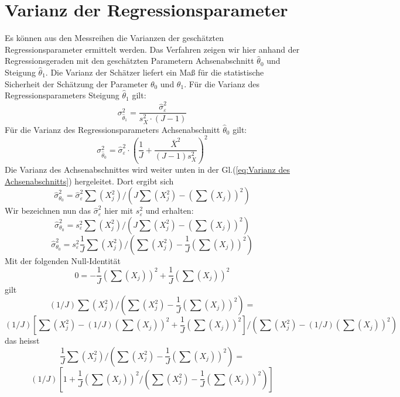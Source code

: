 \section{Varianz der Regressionsparameter}
\label{subsec:vertrauensbereiche}
Es können aus den Messreihen die Varianzen der
geschätzten Regressionsparameter ermittelt werden. Das Verfahren zeigen wir
hier anhand der Regressionsgeraden mit den geschätzten Parametern
Achsenabschnitt $\hat{\theta}_0 $ und Steigung $\hat\theta_1 $.
Die Varianz der Schätzer liefert ein Ma{\ss} f\"{u}r die statistische
Sicherheit der Sch\"{a}tzung der Parameter $\theta _0 $ und
$\theta _1 $.
Für die Varianz des Regressionsparameters Steigung $\hat{\theta}_1 $
gilt:
\begin{equation}
\sigma^2_{\hat{\theta}_1} = \frac{ \hat \sigma^2_{\varepsilon}}{s^2_X \cdot (J- 1) }
\end{equation}
Für die Varianz des Regressionsparameters Achsenabschnitt $\hat{\theta}_0 $
gilt:
\begin{equation}
\sigma^2_{\hat{\theta}_0} = \hat \sigma^2_{\varepsilon} \cdot \left(\frac{1}{J}
	+ \frac{\bar {X}^2}{(J - 1) s_X^2 }\right)^2
\end{equation}
Die Varianz des Achsenabschnittes wird weiter unten in der Gl.(\ref{eq:Varianz des Achsenabschnitts}) hergeleitet. Dort ergibt sich \begin{equation}
\hat \sigma^2_{\theta_0}  = \hat \sigma^2_{\varepsilon}  \sum(X_j^2)  / (J \sum(X_j^2) - (\sum(X_j))^2)
\end{equation}
Wir bezeichnen nun das $\hat \sigma^2_{\varepsilon}$ hier mit $s^2_{\varepsilon}$ und erhalten:
\begin{equation}
\hat \sigma^2_{\theta_0}  = s^2_{\varepsilon} \sum(X_j^2)  / (J \sum(X_j^2) - (\sum(X_j))^2)
\end{equation}
\begin{equation}
\hat \sigma^2_{\theta_0} = s^2_{\varepsilon} \frac{1}{J} \sum(X_j^2)  / (\sum(X_j^2) - \frac{1}{J}(\sum(X_j))^2)
\end{equation}
Mit der folgenden Null-Identität
\begin{equation}
0 =  - \frac{1}{J}(\sum(X_j))^2 + \frac{1}{J}(\sum(X_j))^2
\end{equation}
gilt
\[
(1/J) \sum(X_j^2)  / (\sum(X_j^2) - \frac{1}{J}(\sum(X_j))^2) =
\]
\[
(1/J) [\sum(X_j^2) - (1/J)(\sum(X_j))^2 + \frac{1}{J}(\sum(X_j))^2] / (\sum(X_j^2) - (1/J)(\sum(X_j))^2)
\]
das heisst
\[
\frac{1}{J} \sum(X_j^2)  / (\sum(X_j^2) - \frac{1}{J}(\sum(X_j))^2) =
\]
\[
(1/J) [ 1 + \frac{1}{J}(\sum(X_j))^2 / (\sum(X_j^2) - \frac{1}{J}(\sum(X_j))^2) ]
\]

